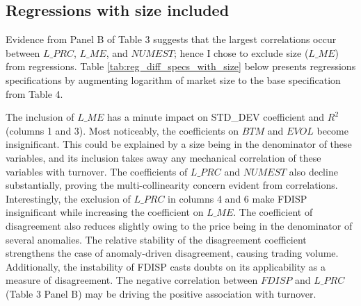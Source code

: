 \documentclass[
  11pt,
  a4paper,
  twoside,
  onecolumn]{article}
\begin{document}
\hypertarget{regressions-with-size-included}{%
\subsection{Regressions with size
included}\label{regressions-with-size-included}}

Evidence from Panel B of Table 3 suggests that the largest correlations
occur between \(L\_PRC\), \(L\_ME\), and \(NUMEST\); hence I chose to
exclude size (\(L\_ME\)) from regressions. Table
\ref{tab:reg_diff_specs_with_size} below presents regressions
specifications by augmenting logarithm of market size to the base
specification from Table 4.

The inclusion of \(L\_ME\) has a minute impact on STD\_DEV coefficient
and \(R^2\) (columns 1 and 3). Most noticeably, the coefficients on
\(BTM\) and \(EVOL\) become insignificant. This could be explained by a
size being in the denominator of these variables, and its inclusion
takes away any mechanical correlation of these variables with turnover.
The coefficients of \(L\_PRC\) and \(NUMEST\) also decline
substantially, proving the multi-collinearity concern evident from
correlations. Interestingly, the exclusion of \(L\_PRC\) in columns 4
and 6 make FDISP insignificant while increasing the coefficient on
\(L\_ME\). The coefficient of disagreement also reduces slightly owing
to the price being in the denominator of several anomalies. The relative
stability of the disagreement coefficient strengthens the case of
anomaly-driven disagreement, causing trading volume. Additionally, the
instability of FDISP casts doubts on its applicability as a measure of
disagreement. The negative correlation between \(FDISP\) and \(L\_PRC\)
(Table 3 Panel B) may be driving the positive association with turnover.
\end{document}
